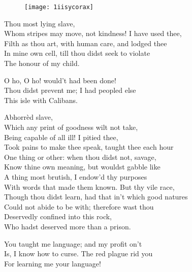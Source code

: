 \begin{figure}[tbh]
	\centering
	\texttt{[image: 1iisycorax]}
\end{figure}

\begin{verse_speech}[Prospero] 
Thou most lying slave,\\
Whom stripes may move, not kindness! I have used thee,\\
Filth as thou art, with human care, and lodged thee\\
In mine own cell, till thou didst seek to violate\\
The honour of my child.
\end{verse_speech}

\begin{verse_speech}[Caliban]
O ho, O ho! would't had been done!\\
Thou didst prevent me; I had peopled else\\
This isle with Calibans.
\end{verse_speech}

\begin{verse_speech}[Miranda] 
Abhorrèd slave,\\
Which any print of goodness wilt not take,\\
Being capable of all ill! I pitied thee,\\
Took pains to make thee speak, taught thee each hour\\
One thing or other: when thou didst not, savage,\\
Know thine own meaning, but wouldst gabble like\\
A thing most brutish, I endow'd thy purposes\\
With words that made them known. But thy vile race,\\
Though thou didst learn, had that in't which good natures\\
Could not abide to be with; therefore wast thou\\
Deservedly confined into this rock,\\
Who hadst deserved more than a prison.
\end{verse_speech}

\begin{verse_speech}[Caliban] 
You taught me language; and my profit on't\\
Is, I know how to curse. The red plague rid you\\
For learning me your language!
\end{verse_speech}

